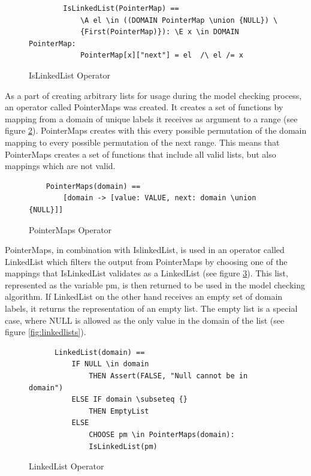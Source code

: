 \begin{figure}[H]
 \vspace{12pt}
\begin{verbatim}
        IsLinkedList(PointerMap) ==
            \A el \in ((DOMAIN PointerMap \union {NULL}) \ 
            {First(PointerMap)}): \E x \in DOMAIN PointerMap:
            PointerMap[x]["next"] = el  /\ el /= x
\end{verbatim}
    
    \caption{IsLinkedList Operator}
    \label{fig:islinkedlist}
\end{figure}


As a part of creating arbitrary lists for usage during the model checking process, an operator called PointerMaps was created. It creates a set of functions by mapping from a domain of unique labels it receives as argument to a range (see figure \ref{fig:pointermaps}). PointerMaps creates with this every possible permutation of the domain mapping to every possible permutation of the next range. This means that PointerMaps creates a set of functions that include all valid lists, but also mappings which are not valid.

\begin{figure}[H]
\vspace{12pt}
\begin{verbatim}
    PointerMaps(domain) == 
        [domain -> [value: VALUE, next: domain \union {NULL}]]
\end{verbatim}
    \caption{PointerMaps Operator}
    \label{fig:pointermaps}
\end{figure}


PointerMaps, in combination with IslinkedList, is used in an operator called LinkedList which filters the output from PointerMaps by choosing one of the mappings that IsLinkedList validates as a LinkedList (see figure \ref{fig:linkedlist}). This list, represented as the variable pm, is then returned to be used in the model checking algorithm. If LinkedList on the other hand receives an empty set of domain labels, it returns the representation of an empty list. The empty list is a special case, where NULL is allowed as the only value in the domain of the list (see figure \ref{fig:linkedlists}).

\begin{figure}[H]
\begin{verbatim}
      LinkedList(domain) == 
          IF NULL \in domain 
              THEN Assert(FALSE, "Null cannot be in domain") 
          ELSE IF domain \subseteq {}
              THEN EmptyList
          ELSE
              CHOOSE pm \in PointerMaps(domain):
              IsLinkedList(pm)
\end{verbatim}
    \caption{LinkedList Operator}
    \label{fig:linkedlist}
\end{figure}


